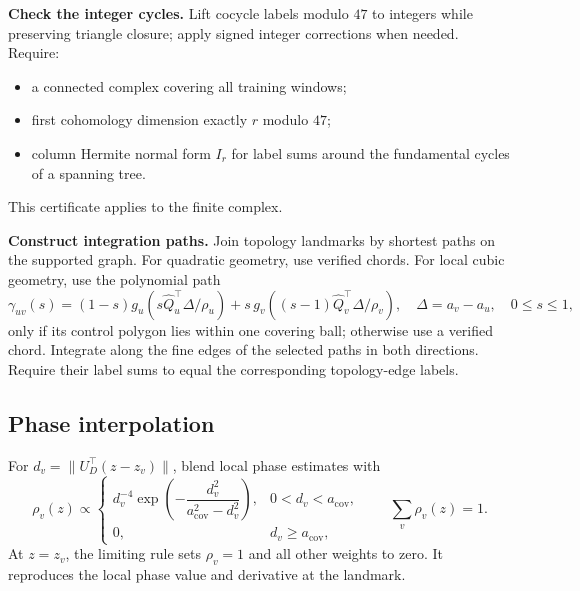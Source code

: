 \documentclass[11pt,a4paper]{article}
\begin{document}
\textbf{Check the integer cycles.}
Lift cocycle labels modulo $47$ to integers while preserving triangle
closure; apply signed integer corrections when needed. Require:
\begin{itemize}
\setlength{\itemsep}{1pt}
\item a connected complex covering all training windows;
\item first cohomology dimension exactly $r$ modulo $47$;
\item column Hermite normal form $I_r$ for label sums around the
fundamental cycles of a spanning tree.
\end{itemize}
This certificate applies to the finite complex.

\textbf{Construct integration paths.}
Join topology landmarks by shortest paths on the supported graph.
For quadratic geometry, use verified chords. For local cubic geometry,
use the polynomial path
\[
\gamma_{uv}(s)=
(1-s)g_u\!\left(s\widehat Q_u^\top\Delta/\rho_u\right)
+s\,g_v\!\left((s-1)\widehat Q_v^\top\Delta/\rho_v\right),
\quad \Delta=a_v-a_u,\quad 0\le s\le1,
\]
only if its control polygon lies within one covering ball; otherwise use
a verified chord. Integrate along the fine edges of the selected paths
in both directions. Require their label sums to equal the corresponding
topology-edge labels.

\subsection*{Phase interpolation}
\label{app:phase-weights}
For $d_v=\|U_D^\top(z-z_v)\|$, blend local phase estimates with
\[
\rho_v(z)\propto
\begin{cases}
d_v^{-4}\exp\!\left(-\dfrac{d_v^2}{a_{\mathrm{cov}}^2-d_v^2}\right),
&0<d_v<a_{\mathrm{cov}},\\
0,&d_v\ge a_{\mathrm{cov}},
\end{cases}
\qquad \sum_v\rho_v(z)=1.
\]
At $z=z_v$, the limiting rule sets $\rho_v=1$ and all other weights to
zero. It reproduces the local phase value and derivative at the landmark.
\end{document}
